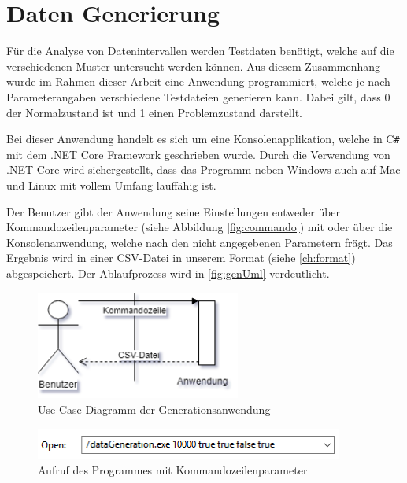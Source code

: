 \newpage
\section{Daten Generierung} \label{ch:generation}

Für die Analyse von Datenintervallen werden Testdaten benötigt, welche auf die verschiedenen Muster untersucht werden können. Aus diesem Zusammenhang wurde im Rahmen dieser Arbeit eine Anwendung programmiert, welche je nach Parameterangaben verschiedene Testdateien generieren kann. Dabei gilt, dass 0 der Normalzustand ist und 1 einen Problemzustand darstellt.

Bei dieser Anwendung handelt es sich um eine Konsolenapplikation, welche in C\texttt{\#} mit dem .NET Core Framework geschrieben wurde. Durch die Verwendung von .NET Core wird sichergestellt, dass das Programm neben Windows auch auf Mac und Linux mit vollem Umfang lauffähig ist. 

Der Benutzer gibt der Anwendung seine Einstellungen entweder über Kommandozeilenparameter (siehe Abbildung \autoref{fig:commando}) mit oder über die Konsolenanwendung, welche nach den nicht angegebenen Parametern frägt. Das Ergebnis wird in einer CSV-Datei in unserem Format (siehe \autoref{ch:format}) abgespeichert. Der Ablaufprozess wird in \autoref{fig:genUml} verdeutlicht.

\vspace{20pt}
\begin{figure}[tbph]
	\centering 
	\includegraphics[width=0.6\textwidth,keepaspectratio] {dataPreparation/images/generationUml.png} 
	\caption{\label {fig:genUml} Use-Case-Diagramm der Generationsanwendung} 
\end{figure}


\vspace{20pt}
\begin{figure}[tbph]
	\centering 
	\includegraphics[width=0.9\textwidth,keepaspectratio] {dataPreparation/images/commando.png} 
	\caption{\label {fig:commando} Aufruf des Programmes mit Kommandozeilenparameter} 
\end{figure}

